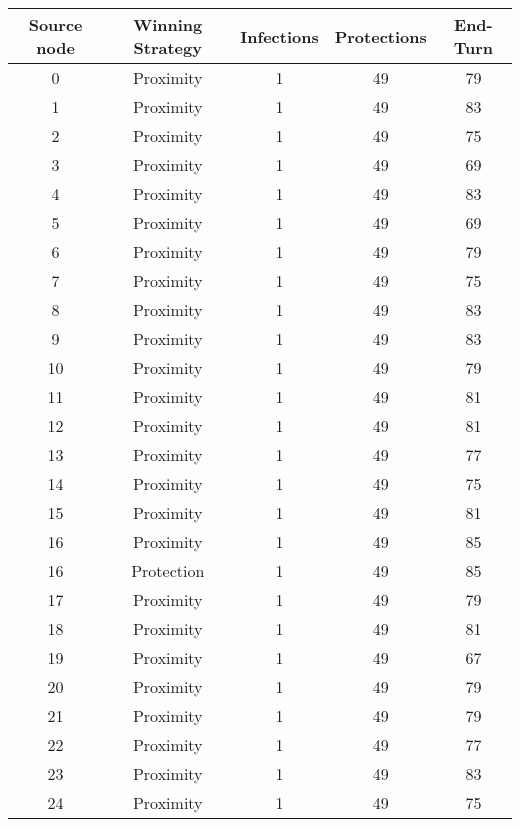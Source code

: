 \documentclass[results.tex]{subfiles}
\begin{document}
\begin{center}
  \begin{tabular}{| c || c | c | c | c |}
    \hline
    {\bfseries Source node} & {\bfseries Winning Strategy} & {\bfseries Infections} & {\bfseries Protections} & {\bfseries End-Turn} \\  %
    \hline\hline
    0 & Proximity & 1 & 49 & 79 \\ 
    \hline
    1 & Proximity & 1 & 49 & 83 \\ 
    \hline
    2 & Proximity & 1 & 49 & 75 \\ 
    \hline
    3 & Proximity & 1 & 49 & 69 \\ 
    \hline
    4 & Proximity & 1 & 49 & 83 \\ 
    \hline
    5 & Proximity & 1 & 49 & 69 \\ 
    \hline
    6 & Proximity & 1 & 49 & 79 \\ 
    \hline
    7 & Proximity & 1 & 49 & 75 \\ 
    \hline
    8 & Proximity & 1 & 49 & 83 \\ 
    \hline
    9 & Proximity & 1 & 49 & 83 \\ 
    \hline
    10 & Proximity & 1 & 49 & 79 \\ 
    \hline
    11 & Proximity & 1 & 49 & 81 \\ 
    \hline
    12 & Proximity & 1 & 49 & 81 \\ 
    \hline
    13 & Proximity & 1 & 49 & 77 \\ 
    \hline
    14 & Proximity & 1 & 49 & 75 \\ 
    \hline
    15 & Proximity & 1 & 49 & 81 \\ 
    \hline
    16 & Proximity & 1 & 49 & 85 \\ 
    \hline
    16 & Protection & 1 & 49 & 85 \\ 
    \hline
    17 & Proximity & 1 & 49 & 79 \\ 
    \hline
    18 & Proximity & 1 & 49 & 81 \\ 
    \hline
    19 & Proximity & 1 & 49 & 67 \\ 
    \hline
    20 & Proximity & 1 & 49 & 79 \\ 
    \hline
    21 & Proximity & 1 & 49 & 79 \\ 
    \hline
    22 & Proximity & 1 & 49 & 77 \\ 
    \hline
    23 & Proximity & 1 & 49 & 83 \\ 
    \hline
    24 & Proximity & 1 & 49 & 75 \\ 

\end{tabular}
\end{center}
\end{document}
